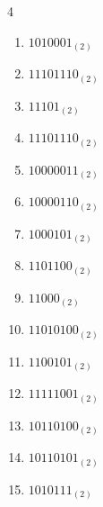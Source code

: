 \begin{multicols}{4}
\begin{enumerate}
        \phantom{$=30$}

  \item $1010001_{(2)}$

        \phantom{$=81$}

\columnbreak %

\resetques

  \item $11101110_{(2)}$

        \phantom{$=238$}

  \item $11101_{(2)}$

        \phantom{$=29$}

  \item $11101110_{(2)}$

        \phantom{$=238$}

  \item $10000011_{(2)}$

        \phantom{$=131$}

  \item $10000110_{(2)}$

        \phantom{$=134$}

  \item $1000101_{(2)}$

        \phantom{$=69$}

  \item $1101100_{(2)}$

        \phantom{$=108$}

  \item $11000_{(2)}$

        \phantom{$=24$}

  \item $11010100_{(2)}$

        \phantom{$=212$}

  \item $1100101_{(2)}$

        \phantom{$=101$}

  \item $11111001_{(2)}$

        \phantom{$=249$}

  \item $10110100_{(2)}$

        \phantom{$=180$}

  \item $10110101_{(2)}$

        \phantom{$=181$}

  \item $1010111_{(2)}$


\end{enumerate}
\end{multicols}
